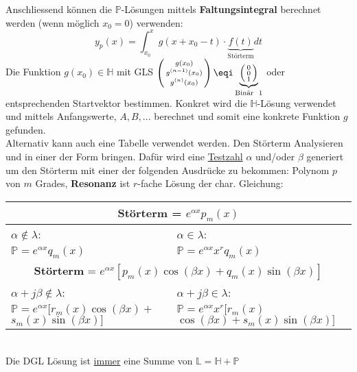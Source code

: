 \noindent Anschliessend können die $\mathbb{P}$-Lösungen mittels \textbf{Faltungsintegral} berechnet werden (wenn möglich $x_0 = 0$) verwenden:
\[
y_p(x) = \int_{x_0}^{x}g(x + x_0 - t)\cdot\underbrace{f(t)}_\text{Störterm}dt
\]
\noindent Die Funktion $g(x_0)\in\mathbb{H}$ mit GLS $\left(\begin{smallmatrix}	g(x_0)\\ g^{(n-1)}(x_0)\\ g^{(n)}(x_0) \end{smallmatrix}\right) \eqi \underbrace{\left(\begin{smallmatrix}	0\\ 0\\ 1 \end{smallmatrix}\right)}_\text{{Binär } 1}$ oder entsprechenden Startvektor bestimmen. Konkret wird die $\mathbb{H}$-Lösung verwendet und mittels Anfangswerte, $A,B,...$ berechnet und somit eine konkrete Funktion $g$ gefunden.\\

\noindent Alternativ kann auch eine Tabelle verwendet werden. Den Störterm Analysieren und in einer der Form bringen. Dafür wird eine \underline{Testzahl} $\alpha$ und/oder $\beta$ generiert um den Störterm mit einer der folgenden Ausdrücke zu bekommen: Polynom $p$ von $m$ Grades, \textbf{Resonanz} ist $r$-fache Lösung der char. Gleichung:\\
\begin{tabular}{p{4.5cm} | p{4.5cm}}
	\multicolumn{2}{c}{\textbf{Störterm} = $e^{\alpha x}p_m(x)$} \\[0.2cm]
	\toprule
	$\alpha \notin \lambda$: & $\alpha\in\lambda$:  \\
	$\mathbb{P} = e^{\alpha x} q_m(x)$ & $\mathbb{P} = e^{\alpha x}x^rq_m(x)$ \\
	\hline
	\multicolumn{2}{c}{\textbf{Störterm} = $e^{\alpha x}\left[p_m(x)\cos(\beta x) + q_m(x)\sin(\beta x)\right]$} \\[0.2cm]
	\toprule
	$\alpha + j\beta \notin \lambda$: & $\alpha + j\beta \in \lambda$:  \\
	$\mathbb{P} = e^{\alpha x}[r_m(x)\cos(\beta x) +$ $ s_m(x)\sin(\beta x)]$ & $\mathbb{P} = e^{\alpha x}x^r [r_m(x)$  $\cos(\beta x) + s_m(x)\sin(\beta x)]$ \\
\end{tabular}\\

\noindent Die DGL Lösung ist \underline{immer} eine Summe von $\mathbb{L} = \mathbb{H} + \mathbb{P}$

